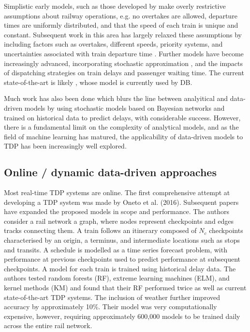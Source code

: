 \documentclass[12pt,a4paper]{article}
\begin{document}
Simplistic early models, such as those developed by \cite{frank_1966} make overly restrictive assumptions about railway operations, e.g. no overtakes are allowed, departure times are uniformly distributed, and that the speed of each train is unique and constant. Subsequent work in this area has largely relaxed these assumptions by including factors such as overtakes, different speeds, priority systems, and uncertainties associated with train departure time \cite{petersen_1974,chen_harker_1990}. Further models have become increasingly advanced, incorporating stochastic approximation \cite{carey_kwiecinski_1994}, and the impacts of dispatching strategies on train delays and passenger waiting time. The current state-of-the-art is likely \cite{berger_et_al_2011}, whose model is currently used by DB.

Much work has also been done which blurs the line between analyitical and data-driven models \cite{kecman_corman_meng_2015,corman_kecman_2018} by using stochastic models based on Bayesian networks and trained on historical data to predict delays, with considerable success. However, there is a fundamental limit on the complexity of analytical models, and as the field of machine learning has matured, the applicability of data-driven models to TDP has been increasingly well explored. 

\subsection{Online / dynamic data-driven approaches}

Most real-time TDP systems are online. The first comprehensive attempt at developing a TDP system was made by Oneto et al. (2016). Subsequent papers \cite{oneto_et_al_2017,oneto_et_al_2019} have expanded the proposed models in scope and performance.
The authors consider a rail network a graph, where nodes represent checkpoints and edges tracks connecting them. A train follows an itinerary composed of $N_c$ checkpoints characterised by an origin, a terminus, and intermediate locations such as stops and transits. A schedule is modelled as a time series forecast problem, with performance at previous checkpoints used to predict performance at subsequent checkpoints. A model for each train is trained using historical delay data. The authors tested random forests (RF), extreme learning machines (ELM), and kernel methods (KM) and found that their RF performed twice as well as current state-of-the-art TDP systems. The inclusion of weather further improved accuracy by approximately 10\%. Their model was very computationally expensive, however, requiring approximately 600,000 models to be trained daily across the entire rail network. 
\end{document}
